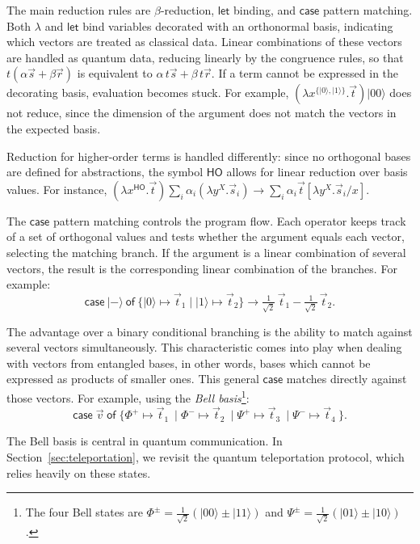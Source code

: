 \documentclass[a4paper,UKenglish,numberwithinsect,pdfa,anonymous]{lipics-v2021}
\theoremstyle{restatestyle}
\newcommand\ket[1]{\ensuremath{|#1\rangle}}
\newcommand\lra{\longrightarrow}
\newcommand\AbsBasis{\ensuremath{\mathsf{H\!O}}}
\def\Lam#1#2#3{\lambda#1^{#2}{.}#3} %
\def\case#1#2#3#4#5{\ensuremath{\mathsf{case}~#1~\mathsf{of}~\{#2\mapsto #4 \mid #3\mapsto #5\}}}
\def\sqrthalf{{\textstyle\frac{1}{\sqrt{2}}}}
\begin{document}
The main reduction rules are $\beta$-reduction, $\mathsf{let}$ binding, and
$\mathsf{case}$ pattern matching.  
Both $\lambda$ and $\mathsf{let}$ bind variables decorated with an orthonormal
basis, indicating which vectors are treated as classical data.  Linear
combinations of these vectors are handled as quantum data, reducing linearly by
the congruence rules, so that $t(\alpha\vec s+\beta\vec r)$ is equivalent to
$\alpha\,t\vec s+\beta\,t\vec r$. If a term cannot be expressed in the decorating
basis, evaluation becomes stuck. For example, $(\Lam{x}{\{\ket{0},\ket{1}\}}{\vec{t}})
\ket{00}$ does not reduce, since the dimension of the argument does
not match the vectors in the expected basis.

Reduction for higher-order terms is handled differently: since no orthogonal bases
are defined for abstractions, the symbol $\AbsBasis$ allows for linear reduction
over basis values. For instance, 
$(\Lam{x}{\AbsBasis}{\vec t}) \sum_i
\alpha_i(\Lam{y}{X}{\vec{s}_{i}}) \lra \sum_i\alpha_i\vec
t[\Lam{y}{X}{\vec{s}_{i}}/x]$.

The $\mathsf{case}$ pattern matching controls the program flow.  
Each operator keeps track of a set of orthogonal values and tests whether the
argument equals each vector, selecting the matching branch.  
If the argument is a linear combination of several vectors, the result is the
corresponding linear combination of the branches.  For example:
\[
  \case{\ket{-}}{\ket{0}}{\ket{1}}{\vec{t}_{1}}{\vec{t}_{2}} \lra
  \tfrac{1}{\sqrt{2}}\,\vec{t}_{1} - \tfrac{1}{\sqrt{2}}\,\vec{t}_{2}.
\]

The advantage over a binary conditional branching is the ability to match against
several vectors simultaneously. This characteristic comes into play when dealing
with vectors from entangled bases, in other words, bases which cannot be expressed
as products of smaller ones.  This general $\mathsf{case}$ matches directly
against those vectors.  For example, using the \emph{Bell basis}\footnote{ The four 
Bell states are $\Phi^{\pm}=\sqrthalf(\ket{00}\pm\ket{11})$ and $\Psi^{\pm}=
\sqrthalf(\ket{01}\pm\ket{10})$.}:
\[
  \mathsf{case}\;\vec{v}\;\mathsf{of}\;\{
  \Phi^+ \mapsto \vec{t}_{1}\ \mid
  \Phi^- \mapsto \vec{t}_{2}\ \mid
  \Psi^+ \mapsto \vec{t}_{3}\ \mid
  \Psi^- \mapsto \vec{t}_{4}\ \}.
\]

The Bell basis is central in quantum communication. In
Section~\ref{sec:teleportation}, we revisit the quantum teleportation protocol,
which relies heavily on these states.
\end{document}
